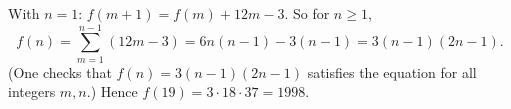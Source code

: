 With $n=1$: $f(m+1)=f(m)+12m-3$. So for $n\ge1$,
\[f(n)=\sum_{m=1}^{n-1}(12m-3)=6n(n-1)-3(n-1)=3(n-1)(2n-1).\]
(One checks that $f(n)=3(n-1)(2n-1)$ satisfies the equation for all integers $m,n$.) Hence $f(19)=3\cdot18\cdot37=\boxed{1998}$.
